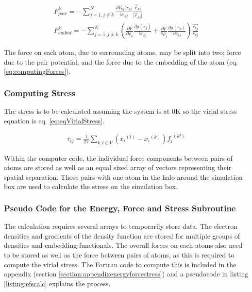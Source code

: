 \begin{equation}
\begin{split}
F^k_{pair} = -\sum \limits_{j=1, j \ne k}^{N} \frac{\partial V_{kj} (r_{kj}}{\partial r_{kj}} \frac{\vec{r}_{kj}}{\lvert\vec{r}_{kj}\lvert} \\
F^k_{embed} = -\sum \limits_{j=1, j \ne k}^{N} \left(\frac{\partial F}{\partial \rho_k} \frac{\partial \rho (r_{j})}{\partial r_{kj}} + \frac{\partial F}{\partial \rho_j} \frac{\partial \rho (r_{k})}{\partial r_{kj}} \right)  \frac{\vec{r_{kj}}}{r_{kj}}
\end{split}
\label{eq:computingForces}
\end{equation}

The force on each atom, due to surrounding atoms, may be split into two; force due to the pair potential, and the force due to the embedding of the atom (eq. \ref{eq:computingForces})\cite{dawbaskeseam}\cite{dlpolymanual}.


\subsubsection{Computing Stress}

The stress is to be calculated assuming the system is at 0K\cite{wikivirialstress} so the virial stress equation is eq. \ref{eq:eqVirialStress}.

\begin{equation}
\begin{split}
\tau_{ij} = \frac{1}{2 V} \sum_{k,l \in V} \left({x_i}^{(l)} - {x_i}^{(k)} \right) {f_j}^{(kl)}
\end{split}
\label{eq:eqVirialStress}
\end{equation}

Within the computer code, the individual force components between pairs of atoms are stored as well as an equal sized array of vectors representing their spatial separation.  Those pairs with one atom in the halo around the simulation box are used to calculate the stress on the simulation box.


\subsubsection{Pseudo Code for the Energy, Force and Stress Subroutine}

The calculation requires several arrays to temporarily store data.  The electron densities and gradients of the density function are stored for multiple groups of densities and embedding functionals.  The overall forces on each atoms also need to be stored as well as the force between pairs of atoms, as this is required to compute the virial stress.  The Fortran code to compute this is included in the appendix (section \ref{section:appendixenergyforcestress}) and a pseudocode in listing \ref{listing:efscalc} explains the process.

